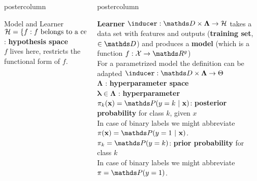 \documentclass{beamer}
\newlength{\columnheight} %
\begin{document}
\begin{frame}[fragile]{}
\begin{columns}
\begin{column}{.31\textwidth}
\begin{beamercolorbox}[center]{postercolumn}
\begin{minipage}{.98\textwidth}
{\begin{myblock}{Model and Learner}
            $\mathcal{H} = \{f: f \text{ belongs to a certain functional family}\}$ : \textbf{hypothesis space} \\
              \hspace*{1ex}$f$ lives here, restricts the functional form of $f$. 					
					\end{myblock}\vfill
				}
			\end{minipage}
		\end{beamercolorbox}
	\end{column}
	\begin{column}{.31\textwidth}
		\begin{beamercolorbox}[center]{postercolumn}
			\begin{minipage}{.98\textwidth}
				\parbox[t][\columnheight]{\textwidth}{
					\begin{myblock}{} \vspace{-4ex}
						 \textbf{Learner }$\inducer: \preimageInducerShort \rightarrow \Hspace$  takes a data set with features and outputs (\textbf{training set}, $\in\allDatasets$)  and produces a \textbf{model} (which is a function $f : \Xspace \rightarrow \R^g$)\\
            \hspace*{1ex}For a parametrized model the definition can be adapted $\inducer: \preimageInducerShort \rightarrow \Theta$ \\
            
              $\bm{\Lambda}$ : \textbf{hyperparameter space} \\
            
              $\bm{\lambda} \in \bm{\Lambda}$ : \textbf{hyperparameter} \\
             
              $\pikx = \postk$: \textbf{posterior probability} for class $k$, given $x$ \\
                \hspace*{1ex}In case of binary labels we might abbreviate $\pix = \post$. \\
            
              $\pi_k = \P(y = k)$:\textbf{ prior probability} for class $k$ \\
                \hspace*{1ex}In case of binary labels we might abbreviate $\pi = \P(y = 1)$. \\
              

\end{myblock}}
\end{minipage}
\end{beamercolorbox}
\end{column}
\end{columns}
\end{frame}
\end{document}
